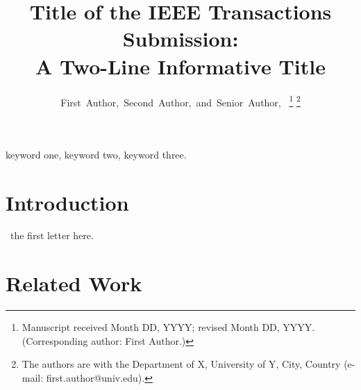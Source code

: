 \documentclass[10pt,journal,final]{IEEEtran}
\title{Title of the IEEE Transactions Submission:\\
A Two-Line Informative Title}
\author{First~Author,~Second~Author,~and~Senior~Author,~\IEEEmembership{Fellow,~IEEE}%
  \thanks{Manuscript received Month DD, YYYY; revised Month DD, YYYY. (Corresponding author: First Author.)}%
  \thanks{The authors are with the Department of X, University of Y, City, Country (e-mail: first.author@univ.edu).}}
\begin{document}
\maketitle

\begin{abstract}
\end{abstract}

\begin{IEEEkeywords}
keyword one, keyword two, keyword three.
\end{IEEEkeywords}

\section{Introduction}
~the first letter here. %

\section{Related Work}

\end{document}

